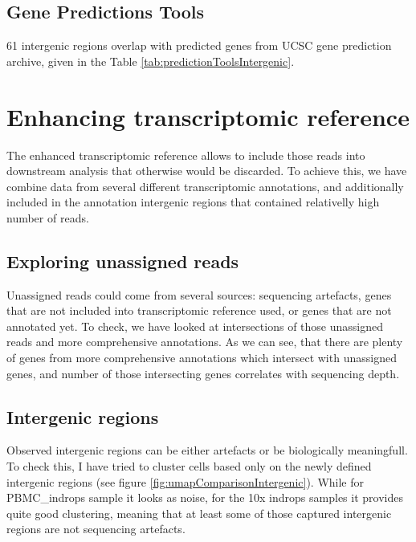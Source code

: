 \subsection{Gene Predictions Tools}

61 intergenic regions overlap with predicted genes from UCSC gene prediction archive, given in the Table \ref{tab:predictionToolsIntergenic}.











\section{Enhancing transcriptomic reference}

The enhanced transcriptomic reference allows to include those reads into downstream analysis that otherwise would be discarded.
To achieve this, we have combine data from several different transcriptomic annotations,
and additionally included in the annotation intergenic regions that contained relativelly high number of reads.



\subsection{Exploring unassigned reads}
Unassigned reads could come from several sources:
sequencing artefacts, genes that are not included into transcriptomic reference used, or genes that are not annotated yet.
To check, we have looked at intersections of those unassigned reads and more comprehensive annotations.
As we can see, that there are plenty of genes from more comprehensive annotations which intersect with unassigned genes,
and number of those intersecting genes correlates with sequencing depth.



\subsection{Intergenic regions}

Observed intergenic regions can be either artefacts or be biologically meaningfull.
To check this, I have tried to cluster cells based only on the newly defined intergenic regions (see figure \ref{fig:umapComparisonIntergenic}).
While for PBMC\_indrops sample it looks as noise, for the 10x indrops samples it provides quite good clustering,
meaning that at least some of those captured intergenic regions are not sequencing artefacts.


